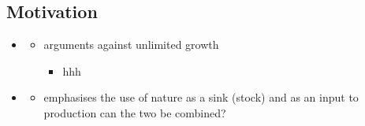 \subsection{Motivation}
\begin{itemize}
\item \cite{Schor2005SustainableReduction}
\begin{itemize}
	\item arguments against unlimited growth
	\begin{itemize}
\item hhh
	\end{itemize}
\end{itemize}
\item \cite{Dasgupta2021}
\begin{itemize}
\item emphasises the use of nature as a sink (stock) and as an input to production \ar can the two be combined?
\end{itemize}
\end{itemize}
